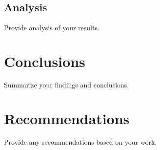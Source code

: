 \documentclass[template=tech-memo]{nasa-latex-docs}
\begin{document}
\subsection{Analysis}

Provide analysis of your results.

\section{Conclusions}

Summarize your findings and conclusions.

\section{Recommendations}

Provide any recommendations based on your work.


\printbibliography


% 
% 
% 
\end{document}
